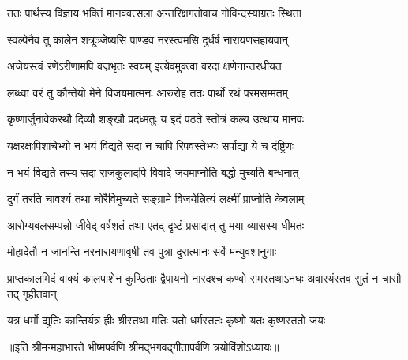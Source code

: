 
\twolineshloka
{ततः पार्थस्य विज्ञाय भक्तिं मानववत्सला}
{अन्तरिक्षगतोवाच गोविन्दस्याग्रतः स्थिता}


\twolineshloka
{स्वल्पेनैव तु कालेन शत्रूञ्जेष्यसि पाण्डव}
{नरस्त्वमसि दुर्धर्ष नारायणसहायवान्}

\twolineshloka
{अजेयस्त्वं रणेऽरीणामपि वज्रभृतः स्वयम्}
{इत्येवमुक्त्वा वरदा क्षणेनान्तरधीयत}

\twolineshloka
{लब्ध्वा वरं तु कौन्तेयो मेने विजयमात्मनः}
{आरुरोह ततः पार्थो रथं परमसम्मतम्}

\twolineshloka
{कृष्णार्जुनावेकरथौ दिव्यौ शङ्खौ प्रदध्मतुः}
{य इदं पठते स्तोत्रं कल्य उत्थाय मानवः}

\twolineshloka
{यक्षरक्षःपिशाचेभ्यो न भयं विद्यते सदा}
{न चापि रिपवस्तेभ्यः सर्पाद्या ये च दंष्ट्रिणः}

\twolineshloka
{न भयं विद्यते तस्य सदा राजकुलादपि}
{विवादे जयमाप्नोति बद्धो मुच्यति बन्धनात्}

\twolineshloka
{दुर्गं तरति चावश्यं तथा चोरैर्विमुच्यते}
{सङ्ग्रामे विजयेन्नित्यं लक्ष्मीं प्राप्नोति केवलाम्}

\twolineshloka
{आरोग्यबलसम्पन्नो जीवेद् वर्षशतं तथा}
{एतद् दृष्टं प्रसादात् तु मया व्यासस्य धीमतः}

\twolineshloka
{मोहादेतौ न जानन्ति नरनारायणावृषी}
{तव पुत्रा दुरात्मानः सर्वे मन्युवशानुगाः}


\threelineshloka
{प्राप्तकालमिदं वाक्यं कालपाशेन कुण्ठिताः}
{द्वैपायनो नारदश्च कण्वो रामस्तथाऽनघः}
{अवारयंस्तव सुतं न चासौ तद् गृहीतवान्}

\twolineshloka
{यत्र धर्मो द्युतिः कान्तिर्यत्र ह्रीः श्रीस्तथा मतिः}
{यतो धर्मस्ततः कृष्णो यतः कृष्णस्ततो जयः}

॥इति श्रीमन्महाभारते भीष्मपर्वणि श्रीमद्भगवद्गीतापर्वणि
त्रयोविंशोऽध्यायः॥
